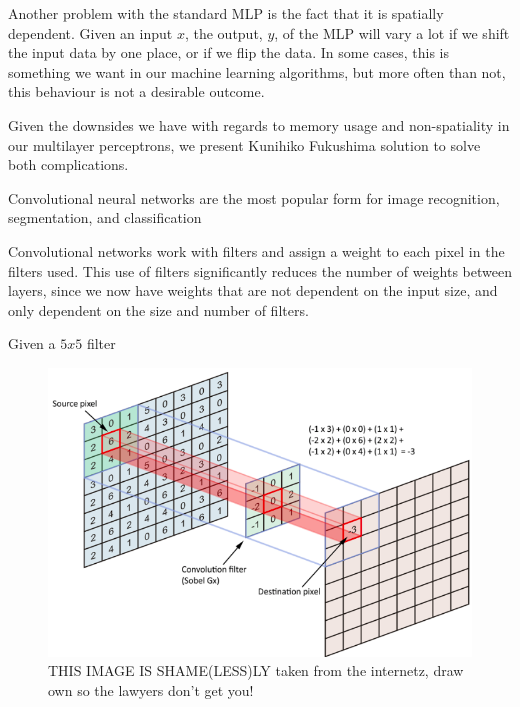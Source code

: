 Another problem with the standard MLP is the fact that it is spatially dependent. Given an input $x$, the output, $y$, of the MLP will vary a lot if we shift the input data by one place, or if we flip the data. In some cases, this is something we want in our machine learning algorithms, but more often than not, this behaviour is not a desirable outcome.

Given the downsides we have with regards to memory usage and non-spatiality in our multilayer perceptrons, we present Kunihiko Fukushima  solution to solve both complications.

Convolutional neural networks are the most popular form for image recognition, segmentation, and classification 


Convolutional networks work with filters and assign a weight to each pixel in the filters used. This use of filters significantly reduces the number of weights between layers, since we now have weights that are not dependent on the input size, and only dependent on the size and number of filters.


Given a $5x5$ filter 

\begin{figure}[ht!]
        \centering
        \includegraphics[scale=0.2]{background/figures/conv_neural_network.png}
        \caption{THIS IMAGE IS SHAME(LESS)LY taken from the internetz, draw own so the lawyers don't get you!}
    \end{figure}
 

